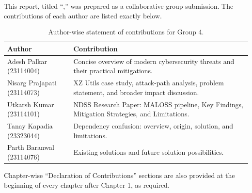 This report, titled ``\ttitle,'' was prepared as a collaborative group submission.
The contributions of each author are listed exactly below.

\begin{table}[h]
\centering
\renewcommand{\arraystretch}{1.2}
\begin{tabular}{p{} p{}}
\toprule
\textbf{Author} & \textbf{Contribution} \\
\midrule
Adesh Palkar (23114004) & Concise overview of modern cybersecurity threats and their practical mitigations. \\
Nisarg Prajapati (23114073) & XZ Utils case study, attack-path analysis, problem statement, and broader impact discussion. \\
Utkarsh Kumar (23114101) & NDSS Research Paper: MALOSS pipeline, Key Findings, Mitigation Strategies, and Limitations. \\
Tanay Kapadia (23323044) & Dependency confusion: overview, origin, solution, and limitations. \\
Parth Baranwal (23114076) & Existing solutions and future solution possibilities. \\
\bottomrule
\end{tabular}
\caption{Author-wise statement of contributions for Group 4.}
\label{tab:statement-contributions}
\end{table}

Chapter-wise ``Declaration of Contributions'' sections are also provided at the beginning of every chapter after Chapter 1, as required.

\clearpage

\begin{abstract}
\addchaptertocentry{\abstractname}

Modern software systems rely heavily on third-party dependencies and package managers. This dependence has increased development speed, but it has also expanded the cyber attack surface, especially in software supply chains. This report studies major cyber threat classes and narrows focus to software supply chain attacks as a high-impact, ecosystem-level risk.

The report presents: (i) an overview of malware, phishing, denial-of-service, insider threats, and supply chain attacks; (ii) a case study of the 2024 XZ Utils backdoor incident; (iii) a review of related research, including MALOSS and dependency confusion analysis; and (iv) a comparative discussion of existing and proposed mitigations, including eBPF-based monitoring, static analysis, and symbolic execution assisted triage.

Our key conclusion is that trust itself becomes the primary attack vector in software supply chains. No single defense is sufficient; robust mitigation requires layered controls across maintainers, registries, developers, and deployment pipelines. The report closes with practical future directions: dependency provenance verification, stronger release integrity checks, continuous monitoring, and faster ecosystem-wide response to newly discovered malicious packages.

\end{abstract}

